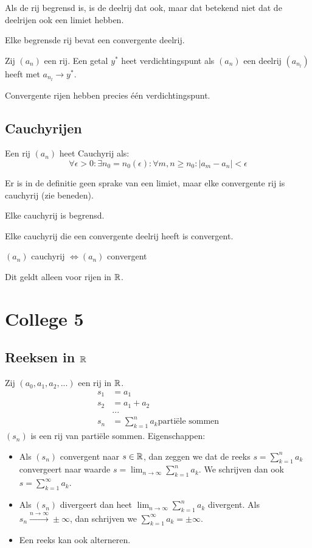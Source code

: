 \documentclass[week=1]{homework}
\begin{document}
	\Letop Als de rij begrensd is, is de deelrij dat ook, maar dat betekend niet dat de deelrijen ook een limiet hebben. 
	
	 Elke begrensde rij bevat een convergente deelrij. 
	
	\Def Zij $(a_n)$ een rij. Een getal $y^*$ heet verdichtingspunt als $(a_n)$ een deelrij $(a_{n_l})$ heeft met $a_{n_l} \rightarrow y^*$. 
	
	\Letop Convergente rijen hebben precies één verdichtingspunt. 
	
	\subsection*{Cauchyrijen}
	\Def Een rij $(a_n)$ heet Cauchyrij als: 
	\[
		\forall \epsilon > 0: \exists n_0 = n_0(\epsilon): \forall m,n \ge n_0: \mid a_m - a_n \mid < \epsilon 
	\]
	
	\Letop Er is in de definitie geen sprake van een limiet, maar elke convergente rij is cauchyrij (zie beneden).
	
	\Stel Elke cauchyrij is begrensd. 
	
	\Stel Elke cauchyrij die een convergente deelrij heeft is convergent. 
	
	\Stel $(a_n)$ cauchyrij $\Leftrightarrow (a_n)$ convergent
	
	\Letop Dit geldt alleen voor rijen in $\mathbb{R}$.
	
	\newpage
	\section*{College 5}
	\subsection*{Reeksen in $\mathbb{R}$}
	\Def Zij $(a_0, a_1, a_2, ...)$ een rij in $\mathbb{R}$. \begin{align*}
		s_1 &= a_1 \\
		s_2 &= a_1 + a_2 \\
		&... \\
		s_n &= \sum_{k=1}^{n} a_k \text{partiële sommen}
	\end{align*}
	$(s_n)$ is een rij van partiële sommen. Eigenschappen:
	\begin{itemize}
		\item Als $(s_n)$ convergent naar $s \in \mathbb{R}$, dan zeggen we dat de reeks $s = \sum_{k=1}^{n} a_k$ convergeert naar waarde $s = \lim_{n \rightarrow \infty} \sum_{k=1}^{n} a_k$. We schrijven dan ook $s = \sum_{k=1}^{\infty} a_k$. 
		\item Als $(s_n)$ divergeert dan heet $\lim_{n \rightarrow \infty} \sum_{k=1}^{n} a_k$ divergent. Als $s_n \xrightarrow{n \rightarrow \infty} \pm \infty$, dan schrijven we $\sum_{k=1}^{\infty} a_k = \pm \infty$.
		\item Een reeks kan ook alterneren. 
	\end{itemize}
	
\end{document}
